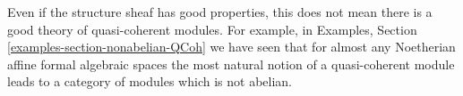 \begin{remark}
\label{remark-bad-quasi-coherent}
Even if the structure sheaf has good properties, this does not
mean there is a good theory of quasi-coherent modules. For example,
in Examples, Section \ref{examples-section-nonabelian-QCoh}
we have seen that for almost any Noetherian affine formal algebraic spaces
the most natural notion of a quasi-coherent module leads to a
category of modules which is not abelian.
\end{remark}










